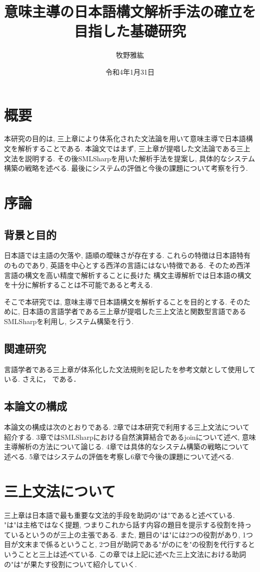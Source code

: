 \documentclass{jreport}
\title{意味主導の日本語構文解析手法の確立を目指した基礎研究}
\author{牧野雅紘}{B8TB2211}
\date{令和4年1月31日}{令和4年1月}
\begin{document}
\maketitle


\chapter*{概要}
本研究の目的は, 三上章により体系化された文法論を用いて意味主導で日本語構文を解析することである.
本論文ではまず, 三上章が提唱した文法論である三上文法を説明する. 
その後SMLSharpを用いた解析手法を提案し, 具体的なシステム構築の戦略を述べる.
最後にシステムの評価と今後の課題について考察を行う.

\setcounter{tocdepth}{1}
\tableofcontents

\chapter{序論}
\section{背景と目的}
日本語では主語の欠落や, 語順の曖昧さが存在する. これらの特徴は日本語特有のものであり, 
英語を中心とする西洋の言語にはない特徴である.  そのため西洋言語の構文を高い精度で解析することに長けた
構文主導解析では日本語の構文を十分に解析することは不可能であると考える. 

そこで本研究では, 意味主導で日本語構文を解析することを目的とする.
そのために, 日本語の言語学者である三上章が提唱した三上文法と関数型言語であるSMLSharpを利用し, システム構築を行う.

\section{関連研究}
言語学者である三上章が体系化した文法規則を記した\cite{bunken1}を参考文献として使用している.
\cite{bunken2}
さえに，
\cite{robobug:2017}
である．


\section{本論文の構成}
本論文の構成は次のとおりである.
2章では本研究で利用する三上文法について紹介する.
3章ではSMLSharpにおける自然演算結合であるjoinについて述べ, 意味主導解析の方法について論じる.
4章では具体的なシステム構築の戦略について述べる.
5章ではシステムの評価を考察し6章で今後の課題について述べる.

\chapter{三上文法について}
三上章は日本語で最も重要な文法的手段を助詞の"は"であると述べている.
"は"は主格ではなく提題, つまりこれから話す内容の題目を提示する役割を持っているというのが三上の主張である.
また, 題目の"は"には2つの役割があり, 1つ目が文末まで係るということ,
2つ目が助詞である"がのにを"の役割を代行するということと三上は述べている.
この章では上記に述べた三上文法における助詞の"は"が果たす役割について紹介していく.
\end{document}
